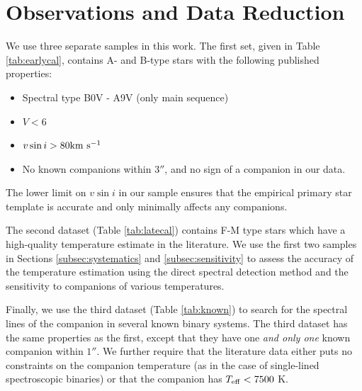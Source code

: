 \documentclass{emulateapj}
\begin{document}
\section{Observations and Data Reduction}
\label{sec:obs}
We use three separate samples in this work. The first set, given in Table \ref{tab:earlycal}, contains  A- and B-type stars with the following published properties:

\begin{itemize}
\item Spectral type B0V - A9V (only main sequence)
\item $V < 6$
\item $v\sin{i} > 80 \rm km \ s^{-1}$
\item No known companions within $3 ''$, and no sign of a companion in our data.
\end{itemize}
The lower limit on $v\sin{i}$ in our sample ensures that the empirical primary star template is accurate and only minimally affects any companions.

The second dataset (Table \ref{tab:latecal}) contains F-M type stars which have a high-quality temperature estimate in the literature. We use the first two samples in Sections \ref{subsec:systematics} and \ref{subsec:sensitivity} to assess the accuracy of the temperature estimation using the direct spectral detection method and the sensitivity to companions of various temperatures.

Finally, we use the third dataset (Table \ref{tab:known}) to search for the spectral lines of the companion in several known binary systems. The third dataset has the same properties as the first, except that they have one \emph{and only one} known companion within $1 ''$. We further require that the literature data either puts no constraints on the companion temperature (as in the case of single-lined spectroscopic binaries) or that the companion has $T_{\rm eff} < 7500$ K. 
\end{document}
